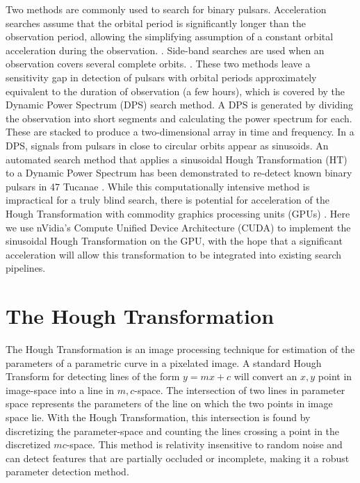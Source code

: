 Two methods are commonly used to search for binary pulsars. Acceleration searches assume that the orbital period is significantly longer than the observation period, allowing the simplifying assumption of a constant orbital acceleration during the observation. \citep{camilo2000observations,ransom2002fourier, Ransom2001a}. Side-band searches are used when an observation covers several complete orbits. \citep{Jouteux2002a, Ransom2003}. These two methods leave a sensitivity gap in detection of pulsars with orbital periods approximately equivalent to the duration of observation (a few hours), which is covered by the Dynamic Power Spectrum (DPS) search method. A DPS is generated by dividing the observation into short segments and calculating the power spectrum for each. These are stacked to produce a two-dimensional array in time and frequency. In a DPS, signals from pulsars in close to circular orbits appear as sinusoids. An automated search method that applies a sinusoidal Hough Transformation (HT) to a Dynamic Power Spectrum has been demonstrated to re-detect known binary pulsars in 47 Tucanae \citep{aulbert2005finding, aulbert2007finding}. While this computationally intensive method is impractical for a truly blind search, there is potential for acceleration of the Hough Transformation with commodity graphics processing units (GPUs) \citep{aulbert2005finding}. Here we use nVidia's Compute Unified Device Architecture (CUDA) to implement the sinusoidal Hough Transformation on the GPU, with the hope that a significant acceleration will allow this transformation to be integrated into existing search pipelines.

\section{The Hough Transformation}

The Hough Transformation is an image processing technique for estimation of the parameters of a parametric curve in a pixelated image. A standard Hough Transform for detecting lines of the form $y=mx+c$ will convert an $x,y$ point in image-space into a line in $m,c$-space. The intersection of two lines in parameter space represents the parameters of the line on which the two points in image space lie. With the Hough Transformation, this intersection is found by discretizing the parameter-space and counting the lines crossing a point in the discretized $mc$-space. This method is relativity insensitive to random noise and can detect features that are partially occluded or incomplete, making it a robust parameter detection method.

